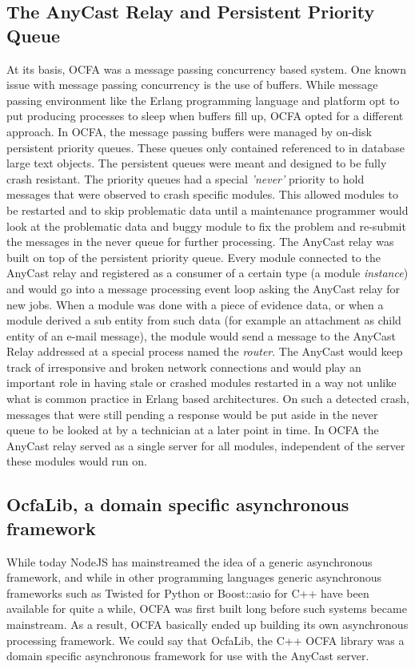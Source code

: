\subsection{The AnyCast Relay and Persistent Priority Queue}
At its basis, OCFA was a message passing concurrency based system. One known issue with message passing concurrency is the use of buffers. While message passing environment like the Erlang programming language and platform opt to put producing processes to sleep when buffers fill up, OCFA opted for a different approach. In OCFA, the message passing buffers were managed by on-disk persistent priority queues. These queues only contained referenced to in database large text objects. The persistent queues were meant and designed to be fully crash resistant. The priority queues had a special \emph{'never'} priority to hold messages that were observed to crash specific modules. This allowed modules to be restarted and to skip problematic data until a maintenance programmer would look at the problematic data and buggy module to fix the problem and re-submit the messages in the never queue for further processing. The AnyCast relay was built on top of the persistent priority queue. Every module connected to the AnyCast relay and registered as a consumer of a certain type (a module \emph{instance}) and would go into a message processing event loop asking the AnyCast relay for new jobs. When a module was done with a piece of evidence data, or when a module derived a sub entity from such data (for example an attachment as child entity of an e-mail message), the module would send a message to the AnyCast Relay addressed at a special process named the \emph{router}. The AnyCast would keep track of irresponsive and broken network connections and would play an important role in having stale or crashed modules restarted in a way not unlike what is common practice in Erlang based architectures. On such a detected crash, messages that were still pending a response would be put aside in the never queue to be looked at by a technician at a later point in time. In OCFA the AnyCast relay served as a single server for all modules, independent of the server these modules would run on.
\subsection{OcfaLib, a domain specific asynchronous framework}
While today NodeJS has mainstreamed the idea of a generic asynchronous framework, and while in other programming languages generic asynchronous frameworks such as Twisted for Python or Boost::asio for C++ have been available for quite a while, OCFA was first built long before such systems became mainstream. As a result, OCFA basically ended up building its own asynchronous processing framework. We could say that OcfaLib, the C++ OCFA library was a domain specific asynchronous framework for use with the AnyCast server. 
